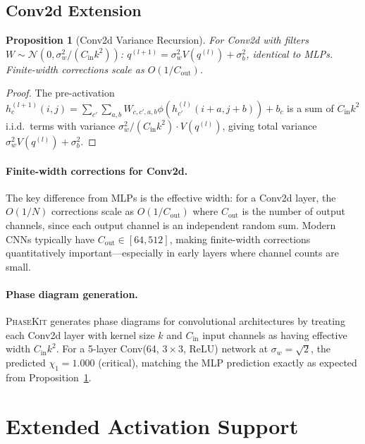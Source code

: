 \documentclass[10pt]{article}
\newcommand{\ToolName}{\textsc{PhaseKit}}
\newtheorem{proposition}[theorem]{Proposition}
\begin{document}
\subsection{Conv2d Extension}

\begin{proposition}[Conv2d Variance Recursion]
\label{prop:conv-variance}
For Conv2d with filters $W \sim \mathcal{N}(0, \sigma_w^2/(C_{\mathrm{in}} k^2))$:
$q^{(l+1)} = \sigma_w^2 V(q^{(l)}) + \sigma_b^2$,
identical to MLPs. Finite-width corrections scale as $O(1/C_{\mathrm{out}})$.
\end{proposition}

\begin{proof}
The pre-activation $h_{c}^{(l+1)}(i,j) = \sum_{c'}\sum_{a,b} W_{c,c',a,b} \phi(h_{c'}^{(l)}(i+a, j+b)) + b_c$ is a sum of $C_{\mathrm{in}} k^2$ i.i.d.\ terms with variance $\sigma_w^2/(C_{\mathrm{in}} k^2) \cdot V(q^{(l)})$, giving total variance $\sigma_w^2 V(q^{(l)}) + \sigma_b^2$.
\end{proof}

\paragraph{Finite-width corrections for Conv2d.}
The key difference from MLPs is the effective width: for a Conv2d layer, the $O(1/N)$ corrections scale as $O(1/C_{\mathrm{out}})$ where $C_{\mathrm{out}}$ is the number of output channels, since each output channel is an independent random sum.
Modern CNNs typically have $C_{\mathrm{out}} \in [64, 512]$, making finite-width corrections quantitatively important---especially in early layers where channel counts are small.

\paragraph{Phase diagram generation.}
\ToolName{} generates phase diagrams for convolutional architectures by treating each Conv2d layer with kernel size $k$ and $C_{\mathrm{in}}$ input channels as having effective width $C_{\mathrm{in}} k^2$.
For a 5-layer Conv(64, $3\times 3$, ReLU) network at $\sigma_w = \sqrt{2}$, the predicted $\chi_1 = 1.000$ (critical), matching the MLP prediction exactly as expected from Proposition~\ref{prop:conv-variance}.

\section{Extended Activation Support}
\label{app:extended-act}
\end{document}
